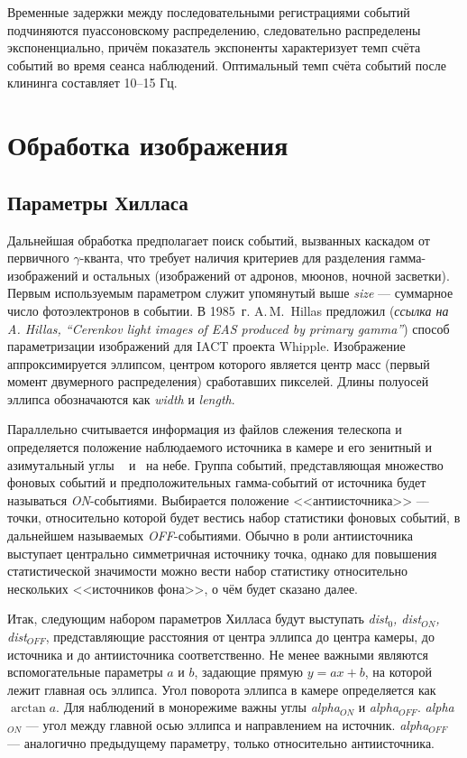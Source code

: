 \documentclass[magd,floatypics,numeref]{msudipl} %
\begin{document}
Временные задержки между последовательными регистрациями событий подчиняются пуассоновскому распределению, следовательно распределены экспоненциально, причём показатель экспоненты характеризует темп счёта событий во время сеанса наблюдений. Оптимальный темп счёта событий после клининга составляет 10--15 Гц. 
\section{Обработка изображения}
\subsection{Параметры Хилласа}
\label{HillasParams}
Дальнейшая обработка предполагает поиск событий, вызванных каскадом от первичного $\gamma$-кванта, что требует наличия критериев для разделения гамма-изображений и остальных (изображений от адронов, мюонов, ночной засветки). 
Первым используемым параметром служит упомянутый выше \textit{size} --- суммарное число фотоэлектронов в событии. 
В 1985~г. A.\,M.~Hillas предложил (\textit{ссылка на A. Hillas, “Cerenkov light images of EAS produced by primary gamma”}) способ параметризации изображений для IACT проекта Whipple. Изображение аппроксимируется эллипсом, центром которого является центр масс (первый момент двумерного распределения) сработавших пикселей. Длины полуосей эллипса обозначаются как \textit{width} и \textit{length}.

Параллельно считывается информация из файлов слежения телескопа и определяется положение наблюдаемого источника в камере и  его зенитный и азимутальный углы \theta~ и \varphi ~на небе.  Группа событий, представляющая множество фоновых событий и предположительных гамма-событий от источника будет называться \textit{ON}-событиями. Выбирается положение <<антиисточника>> --- точки, относительно которой будет вестись набор статистики фоновых событий, в дальнейшем называемых \textit{OFF}-событиями. Обычно в роли антиисточника выступает центрально симметричная источнику точка, однако для повышения статистической значимости можно вести набор статистику относительно нескольких <<источников фона>>, о чём будет сказано далее.   

Итак, следующим набором параметров Хилласа будут выступать \textit{dist$_{0}$, dist$_{ON}$,  dist$_{OFF}$}, представляющие расстояния от центра эллипса до центра камеры, до источника и до антиисточника соответственно. Не менее важными являются вспомогательные параметры $a$ и $b$, задающие прямую $y = ax + b$, на которой лежит главная ось эллипса. Угол поворота эллипса в камере определяется как $\arctan a$. Для наблюдений в монорежиме важны углы \textit{alpha$_{ON}$} и \textit{alpha$_{OFF}$}. \textit{alpha$_{ON}$} --- угол между главной осью эллипса и направлением на источник.  \textit{alpha$_{OFF}$} --- аналогично предыдущему параметру, только относительно антиисточника.
\end{document}
